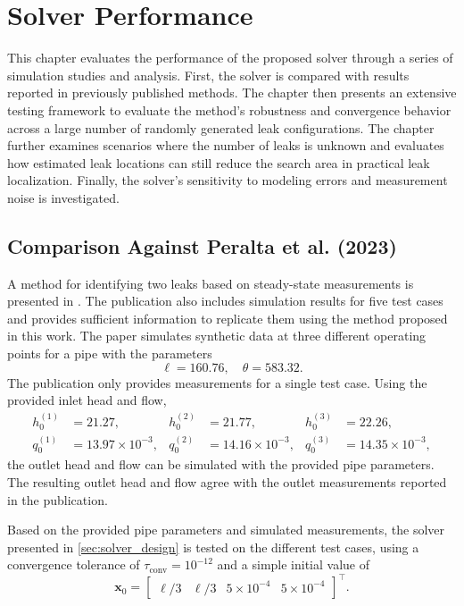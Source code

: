 \chapter{Solver Performance}\label{chap:results_performance}

This chapter evaluates the performance of the proposed solver through a series of simulation studies and analysis. First, the solver is compared with results reported in previously published methods. The chapter then presents an extensive testing framework to evaluate the method's robustness and convergence behavior across a large number of randomly generated leak configurations. The chapter further examines scenarios where the number of leaks is unknown and evaluates how estimated leak locations can still reduce the search area in practical leak localization. Finally, the solver's sensitivity to modeling errors and measurement noise is investigated. 

\section{Comparison Against Peralta et al. (2023)}

A method for identifying two leaks based on steady-state measurements is presented in \cite{peralta2023}. The publication also includes simulation results for five test cases and provides sufficient information to replicate them using the method proposed in this work. The paper simulates synthetic data at three different operating points for a pipe with the parameters
\begin{equation*}
    \ell=160.76, \quad \theta = 583.32.
\end{equation*}
The publication only provides measurements for a single test case. Using the provided inlet head and flow,
\begin{align*}
h_0^{(1)} &= 21.27, &
h_0^{(2)} &= 21.77, &
h_0^{(3)} &= 22.26, \\
q_0^{(1)} &= 13.97\times 10^{-3}, &
q_0^{(2)} &= 14.16\times 10^{-3}, &
q_0^{(3)} &= 14.35\times 10^{-3},
\end{align*}
the outlet head and flow can be simulated with the provided pipe parameters. The resulting outlet head and flow agree with the outlet measurements reported in the publication. 

\newpage
Based on the provided pipe parameters and simulated measurements, the solver presented in \autoref{sec:solver_design} is tested on the different test cases, using a convergence tolerance of $\tau_{\text{conv}}=10^{-12}$ and a simple initial value of
\begin{equation*}
    \mathbf{x}_0=\begin{bmatrix}
        \ell/3 & \ell/3 & 5\times10^{-4} & 5\times10^{-4}
    \end{bmatrix}^\top.
\end{equation*}

